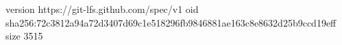 version https://git-lfs.github.com/spec/v1
oid sha256:72c3812a94a72d3407d69c1e518296fb9846881ae163c8e8632d25b9ccd19eff
size 3515
